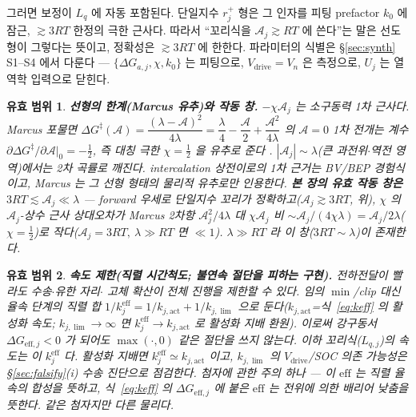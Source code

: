 \documentclass[11pt,a4paper]{article}
\newtheorem*{boundbox}{유효 범위}
\newcommand{\eff}{\mathrm{eff}}
\newcommand{\drive}{\mathrm{drive}}
\begin{document}
그러면 보정이 $L_q$ 에 자동 포함된다. 단일지수 $r_j^+$ 형은 그 인자를 피팅 prefactor $k_0$ 에 잠근, $\gtrsim3RT$
한정의 극한 근사다. 따라서 ``꼬리식을 $\mathcal A_j\gtrsim RT$ 에 쓴다''는 말은 선도형이 그렇다는 뜻이고, 정확성은
$\gtrsim3RT$ 에 한한다. 파라미터의 식별은 \S\ref{sec:synth} S1--S4 에서 다룬다 — $\{\Delta G_{a,j},\chi,k_0\}$
는 피팅으로, $V_\drive=V_n$ 은 측정으로, $U_j$ 는 열역학 입력으로 닫힌다.
\begin{boundbox}
\textbf{선형의 한계(Marcus 유추)와 작동 창.} $-\chi\mathcal A_j$ 는 \emph{소구동력 1차} 근사다. Marcus 포물면
$\Delta G^\ddagger(\mathcal A)=\dfrac{(\lambda-\mathcal A)^2}{4\lambda}=\dfrac{\lambda}{4}-\dfrac{\mathcal A}{2}
+\dfrac{\mathcal A^2}{4\lambda}$ 의 $\mathcal A=0$ 1차 전개는 계수 $\partial\Delta G^\ddagger/\partial\mathcal A|_0
=-\tfrac12$, 즉 대칭 극한 $\chi=\tfrac12$ 을 \emph{유추}로 준다 \cite{marcus1956}. $|\mathcal A_j|\sim\lambda$(큰
과전위$\cdot$역전 영역)에서는 2차 곡률로 깨진다. \emph{intercalation 상전이로의 1차 근거는 BV/BEP 경험식이고,
Marcus 는 그 선형 형태의 물리적 유추로만 인용한다.} \textbf{본 장의 유효 작동 창은 $3RT\lesssim\mathcal A_j\ll\lambda$}
— forward 우세로 단일지수 꼬리가 정확하고($\mathcal A_j\gtrsim3RT$, 위), $\chi$ 의 $\mathcal A_j$-상수 근사 상대오차가 Marcus
2차항 $\mathcal A_j^2/4\lambda$ 대 $\chi\mathcal A_j$ 비 $\sim\mathcal A_j/(4\chi\lambda)=\mathcal A_j/2\lambda$($\chi=\tfrac12$)로 작다($\mathcal A_j=3RT,\ \lambda\gg RT$ 면 $\ll1$).
$\lambda\gg RT$ 라 이 창($3RT\sim\lambda$)이 존재한다.
\end{boundbox}
\begin{boundbox}
\textbf{속도 제한(직렬 시간척도; 불연속 절단을 피하는 구현).} 전하전달이 빨라도 수송$\cdot$유한 자리$\cdot$
고체 확산이 전체 진행을 제한할 수 있다. 임의 $\min$/clip 대신 율속 단계의 직렬 합 $1/k_j^{\eff}=1/k_{j,\mathrm{act}}+1/k_{j,\lim}$
으로 둔다($k_{j,\mathrm{act}}$=식~\eqref{eq:keff} 의 활성화 속도; $k_{j,\lim}\to\infty$ 면 $k_j^{\eff}\to k_{j,\mathrm{act}}$ 로 활성화
지배 환원). 이로써 강구동서 $\Delta G_{\eff,j}<0$ 가 되어도 $\max(\cdot,0)$ 같은 절단을 쓰지 않는다. 이하 꼬리식($L_{q,j}$)의
속도는 이 $k_j^{\eff}$ 다. 활성화 지배면 $k_j^{\eff}\simeq k_{j,\mathrm{act}}$ 이고, $k_{j,\lim}$ 의
$V_\drive$/SOC 의존 가능성은 \S\ref{sec:falsify}(i) 수송 진단으로 점검한다. 첨자에 관한 주의 하나 — 이
$\eff$ 는 직렬 율속의 합성을 뜻하고, 식~\eqref{eq:keff} 의 $\Delta G_{\eff,j}$ 에 붙은 $\eff$ 는 전위에 의한
배리어 낮춤을 뜻한다. 같은 첨자지만 다른 물리다.
\end{boundbox}
\end{document}
